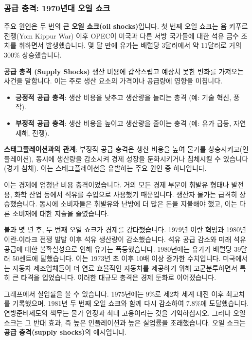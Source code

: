 \documentclass[11pt,a4paper]{book}
\theoremstyle{definition}
\begin{document}
\subsubsection*{공급 충격: 1970년대 오일 쇼크}

주요 원인은 두 번의 큰 \textbf{오일 쇼크(oil shocks)}입니다. 첫 번째 오일 쇼크는 욤 키푸르 전쟁(Yom Kippur War) 이후 OPEC이 미국과 다른 서방 국가들에 대한 석유 금수 조치를 취하면서 발생했습니다. 몇 달 만에 유가는 배럴당 3달러에서 약 11달러로 거의 300\% 상승했습니다.

\begin{conceptbox}
\textbf{공급 충격 (Supply Shocks)}
생산 비용에 갑작스럽고 예상치 못한 변화를 가져오는 사건을 말합니다. 이는 주로 생산 요소의 가격이나 공급량에 영향을 미칩니다.
\begin{itemize}
    \item \textbf{긍정적 공급 충격}: 생산 비용을 낮추고 생산량을 늘리는 충격 (예: 기술 혁신, 풍작).
    \item \textbf{부정적 공급 충격}: 생산 비용을 높이고 생산량을 줄이는 충격 (예: 유가 급등, 자연재해, 전쟁).
\end{itemize}
\textbf{스태그플레이션과의 관계}: 부정적 공급 충격은 생산 비용을 높여 물가를 상승시키고(인플레이션), 동시에 생산량을 감소시켜 경제 성장을 둔화시키거나 침체시킬 수 있습니다(경기 침체). 이는 스태그플레이션을 유발하는 주요 원인 중 하나입니다.
\end{conceptbox}

이는 경제에 엄청난 비용 충격이었습니다. 거의 모든 경제 부문이 휘발유 형태나 발전용, 화학 산업 등에서 석유를 수입으로 사용했기 때문입니다. 생산자 물가는 급격히 상승했습니다. 동시에 소비자들은 휘발유와 난방에 더 많은 돈을 지불해야 했고, 이는 다른 소비재에 대한 지출을 줄였습니다.

불과 몇 년 후, 두 번째 오일 쇼크가 경제를 강타했습니다. 1979년 이란 혁명과 1980년 이란-이라크 전쟁 발발 이후 석유 생산량이 감소했습니다. 석유 공급 감소와 미래 석유 공급에 대한 불확실성으로 인해 유가는 폭등했습니다. 1980년에는 유가가 배럴당 39달러 50센트에 달했습니다. 이는 1973년 초 이후 10배 이상 증가한 수치입니다. 미국에서는 자동차 제조업체들이 더 연료 효율적인 자동차를 제공하기 위해 고군분투하면서 특히 큰 타격을 입었습니다. 이러한 대규모 충격은 경제 둔화로 이어졌습니다.

그래프에서 실업률을 볼 수 있습니다. 1975년에는 9\%로 제2차 세계 대전 이후 최고치를 기록했으며, 1981년 두 번째 오일 쇼크와 함께 다시 감소하여 7.8\%에 도달했습니다. 연방준비제도의 책무는 물가 안정과 최대 고용이라는 것을 기억하십시오. 그러나 오일 쇼크는 그 반대 효과, 즉 높은 인플레이션과 높은 실업률을 초래했습니다. 오일 쇼크는 \textbf{공급 충격(supply shocks)}의 예시입니다.
\end{document}
